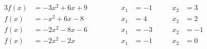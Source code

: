 \begin{alignat*}{3}
  f(x)&=-\num{3}x^{\num{2}}+\num{6}x+\num{9} & \qquad\qquad x_1&=-1 & \qquad x_2&=3 \\
  f(x)&=-x^{\num{2}}+\num{6}x-\num{8} & \qquad\qquad x_1&=4 & \qquad x_2&=2 \\
  f(x)&=-\num{2}x^{\num{2}}-\num{8}x-\num{6} & \qquad\qquad x_1&=-3 & \qquad x_2&=-1 \\
  f(x)&=-\num{2}x^{\num{2}}-\num{2}x & \qquad\qquad x_1&=-1 & \qquad x_2&=0
\end{alignat*}
